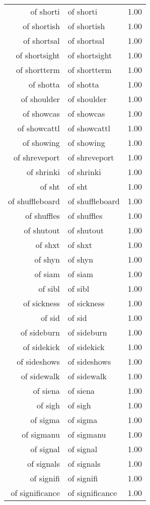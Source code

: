 \begin{table}[ht]
\begin{tabular}{rlr}
  of shorti & of shorti & 1.00 \\ 
  of shortish & of shortish & 1.00 \\ 
  of shortsal & of shortsal & 1.00 \\ 
  of shortsight & of shortsight & 1.00 \\ 
  of shortterm & of shortterm & 1.00 \\ 
  of shotta & of shotta & 1.00 \\ 
  of shoulder & of shoulder & 1.00 \\ 
  of showcas & of showcas & 1.00 \\ 
  of showcattl & of showcattl & 1.00 \\ 
  of showing & of showing & 1.00 \\ 
  of shreveport & of shreveport & 1.00 \\ 
  of shrinki & of shrinki & 1.00 \\ 
  of sht & of sht & 1.00 \\ 
  of shuffleboard & of shuffleboard & 1.00 \\ 
  of shuffles & of shuffles & 1.00 \\ 
  of shutout & of shutout & 1.00 \\ 
  of shxt & of shxt & 1.00 \\ 
  of shyn & of shyn & 1.00 \\ 
  of siam & of siam & 1.00 \\ 
  of sibl & of sibl & 1.00 \\ 
  of sickness & of sickness & 1.00 \\ 
  of sid & of sid & 1.00 \\ 
  of sideburn & of sideburn & 1.00 \\ 
  of sidekick & of sidekick & 1.00 \\ 
  of sideshows & of sideshows & 1.00 \\ 
  of sidewalk & of sidewalk & 1.00 \\ 
  of siena & of siena & 1.00 \\ 
  of sigh & of sigh & 1.00 \\ 
  of sigma & of sigma & 1.00 \\ 
  of sigmanu & of sigmanu & 1.00 \\ 
  of signal & of signal & 1.00 \\ 
  of signals & of signals & 1.00 \\ 
  of signifi & of signifi & 1.00 \\ 
  of significance & of significance & 1.00 \\ 

\end{tabular}
\end{table}
